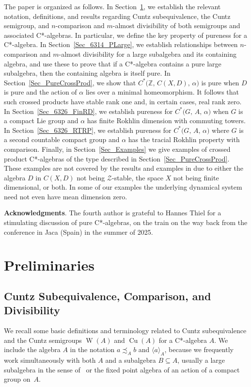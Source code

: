 \documentclass[10pt]{amsart}
\numberwithin{equation}{section}
\theoremstyle{definition}
\newcommand{\af}{\alpha}
\newcommand{\Z}{{\mathbb{Z}}}
\newcommand{\Cu}{{\operatorname{Cu}}}
\newcommand{\W}{{\operatorname{W}}}
\newcommand{\ca}{C*-algebra}
\newcommand{\ccA}[1]{\langle #1 \rangle_A}
\newcommand{\JS}{\mathcal{Z}}
\begin{document}
The paper is organized as follows.
In Section~\ref{S_Prelims},
we establish the relevant notation, definitions, and results
regarding Cuntz subequivalence, the Cuntz semigroup, and
$n$-comparison and $m$-almost divisibility of both
semigroups and associated C*-algebras.
In particular, we
define the key property of pureness for a C*-algebra.
In
Section~\ref{Sec_6314_PLarge}, we establish relationships
between $n$-comparison and $m$-almost divisibility for
a large subalgebra and its containing algebra, and use these
to prove that if a C*-algebra contains a pure large subalgebra,
then the containing algebra is itself pure.
In Section~\ref{Sec_PureCrossProd}, we show that
$C^* \bigl( \Z, \, C (X, D), \, \af \bigr)$ is pure
when $D$ is pure and the action of $\af$ lies over a
minimal homeomorphism.
It follows that such
crossed products have stable rank one and, in certain cases,
real rank zero.
In Section~\ref{Sec_6326_FinRD}, we
establish pureness for
$C^* \bigl( G, \, A, \, \af \bigr)$ when $G$ is a compact
Lie group and $\af$ has finite Rokhlin dimension with
commuting towers.
In Section~\ref{Sec_6326_RTRP}, we
establish pureness for
$C^* \bigl( G, \, A, \, \af \bigr)$ where $G$ is a
second countable compact
group and $\af$ has the tracial Rokhlin property with
comparison.
Finally, in Section~\ref{Sec_Examples} we give
examples of crossed product C*-algebras of the type described
in Section~\ref{Sec_PureCrossProd}.
These examples are not
covered by the results and examples in \cite{ArBcPh2} due
to either the algebra $D$ in $C(X,D)$ not being $\JS$-stable,
the space $X$ not being finite dimensional, or both.
In some of our examples the underlying dynamical system need
not even have mean dimension zero.

\textbf{Acknowledgments}.
The fourth author is grateful to Hannes Thiel
for a stimulating discussion of pure \ca{s}, on the train on the
way back from the conference in Jaca (Spain)
in the summer of 2025.

\section{Preliminaries}\label{S_Prelims}

\subsection{Cuntz Subequivalence, Comparison, and
 Divisibility}\label{SubSec_CuA}

We recall some basic definitions and terminology related to
Cuntz subequivalence and the Cuntz semigroups $\W (A)$ and
$\Cu (A)$ for a C*-algebra $A$.
We include the algebra $A$ in the notation $a \precsim_A b$
and $\ccA{a}$,
because we frequently work simultaneously with both $A$
and a subalgebra $B \subseteq A$,
usually a large subalgebra in the sense of~\cite{Phl40}
or the fixed point algebra of an action of a compact group on~$A$.
\end{document}
